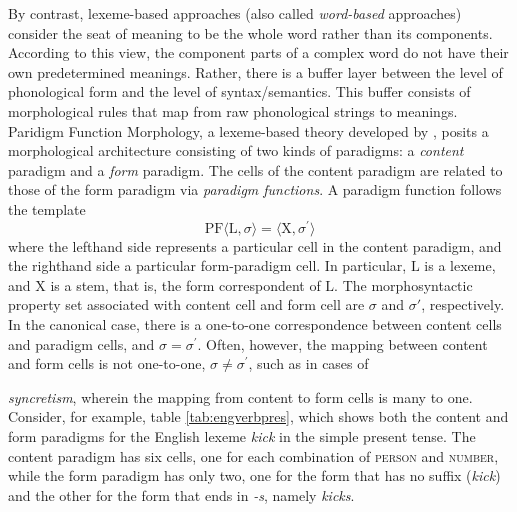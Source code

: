 By contrast, lexeme-based approaches (also called \emph{word-based} 
approaches) consider the seat of meaning to be the whole word rather than its components. According to this view, the component 
parts of a complex word do not have their own predetermined meanings. 
Rather, 
there is a buffer layer between the level of phonological form and the level of
syntax/semantics. This
buffer consists of morphological rules that map from raw phonological 
strings to meanings.
Paridigm Function Morphology, a lexeme-based theory developed by \citet{stump:2001}, 
posits a morphological architecture consisting of two kinds of paradigms: a \emph{content} paradigm and a \emph{form} paradigm.
The cells of the content paradigm are related to those of the form paradigm via
\emph{paradigm functions}.
A paradigm function follows the template
\begin{equation}
\label{eq:PF}
	\text{PF}\langle \text{L},\sigma \rangle = \langle \text{X}, \sigma^\prime \rangle
\end{equation}
where the lefthand side represents a particular cell in the 
content paradigm, and the righthand side a particular form-paradigm cell.
In particular, $\text{L}$ is a lexeme, and $\text{X}$ is a stem, that is, the form correspondent of $\text{L}$. 
The morphosyntactic property set associated with content cell and form cell are $\sigma$ and 
$\sigma\prime$, respectively. In the canonical case, there is a one-to-one
correspondence between content cells and paradigm cells, and 
$\sigma = \sigma^\prime$.
Often, however, the mapping between content and form cells is 
not one-to-one, $\sigma \ne \sigma^\prime$, such as in cases of

\emph{syncretism}, wherein the mapping from content to form cells is many to one. 
Consider, for example, table 
\ref{tab:engverbpres}, which shows both the content and form paradigms 
for the English lexeme \emph{kick} in the simple present tense.
The content paradigm has six cells, one for each combination of \textsc{person} 
and \textsc{number}, while the form paradigm has only two, one for the 
form that has no suffix (\textit{kick}) and the other for the form 
that ends in \textit{-s}, namely \textit{kicks}. 
 
